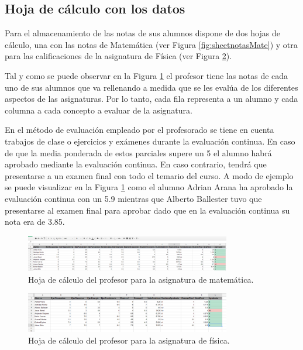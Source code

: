 \subsection{Hoja de cálculo con los datos}

Para el almacenamiento de las notas de sus alumnos dispone de dos hojas de cálculo, una con las notas de Matemática (ver Figura \ref{fig:sheetnotasMate}) y otra para las calificaciones de la asignatura de Física (ver Figura \ref{fig:sheetNotasFisica}).

Tal y como se puede observar en la Figura \ref{fig:sheetNotasMate} el profesor tiene las notas de cada uno de sus alumnos que va rellenando a medida que se les evalúa de los diferentes aspectos de las asignaturas. Por lo tanto, cada fila representa a un alumno y cada columna a cada concepto a evaluar de la asignatura.

En el método de evaluación empleado por el profesorado se tiene en cuenta trabajos de clase o ejercicios y exámenes durante la evaluación continua. En caso de que la media ponderada de estos parciales supere un 5 el alumno habrá aprobado mediante la evaluación continua. En caso contrario, tendrá que presentarse a un examen final con todo el temario del curso. A modo de ejemplo se puede visualizar en la Figura \ref{fig:sheetNotasMate} como el alumno Adrian Arana ha aprobado la evaluación continua con un 5.9 mientras que Alberto Ballester tuvo que presentarse al examen final para aprobar dado que en la evaluación continua su nota era de 3.85.

\begin{figure}[htb]
	\centering
	\includegraphics[width=0.8\textwidth]{./figs/sheetNotasMate.png}
	\caption{Hoja de cálculo del profesor para la asignatura de matemática.} \label{fig:sheetNotasMate}
\end{figure}

\begin{figure}[htb]
	\centering
	\includegraphics[width=0.8\textwidth]{./figs/sheetNotasFisica.png}
	\caption{Hoja de cálculo del profesor para la asignatura de física.} \label{fig:sheetNotasFisica}
\end{figure}

